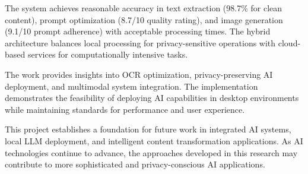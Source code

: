 The system achieves reasonable accuracy in text extraction (98.7\% for clean content), prompt optimization (8.7/10 quality rating), and image generation (9.1/10 prompt adherence) with acceptable processing times. The hybrid architecture balances local processing for privacy-sensitive operations with cloud-based services for computationally intensive tasks.

The work provides insights into OCR optimization, privacy-preserving AI deployment, and multimodal system integration. The implementation demonstrates the feasibility of deploying AI capabilities in desktop environments while maintaining standards for performance and user experience.

This project establishes a foundation for future work in integrated AI systems, local LLM deployment, and intelligent content transformation applications. As AI technologies continue to advance, the approaches developed in this research may contribute to more sophisticated and privacy-conscious AI applications.

